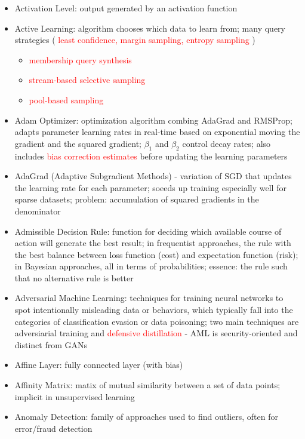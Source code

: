 \documentclass[a4paper]{article}
\newcommand{\cmark}{\ding{51}}%
\newcommand{\done}{\rlap{$\square$}{\raisebox{2pt}{\large\hspace{1pt}\cmark}}\hspace{-2.5pt}}
\newcommand{\followup}[1]{\textcolor{red}{ #1 }}
\begin{document}
\begin{itemize}
    \item [\done] Activation Level: output generated by an activation function
    \item [\done]  Active Learning: algorithm chooses which data to learn from; many query strategies (\followup{least confidence, margin sampling, entropy sampling})
    \begin{itemize}
        \item \followup{membership query synthesis}
        \item \followup{stream-based selective sampling}
        \item \followup{pool-based sampling}
    \end{itemize}
    \item [\done] Adam Optimizer: optimization algorithm combing AdaGrad and RMSProp; adapts parameter learning rates in real-time based on exponential moving the gradient and the squared gradient; $\beta_1$ and $\beta_2$ control decay rates; also includes \followup{bias correction estimates} before updating the learning parameters
    \item [\done] AdaGrad (Adaptive Subgradient Methods) - variation of SGD that updates the learning rate for each parameter; soeeds up training especially well for sparse datasets; problem: accumulation of squared gradients in the denominator
    \item [\done] Admissible Decision Rule: function for deciding which available course of action will generate the best result; in frequentist approaches, the rule with the best balance between loss function (cost) and expectation function (risk); in Bayesian approaches, all in terms of probabilities; essence: the rule such that no alternative rule is better
    \item [\done] Adversarial Machine Learning: techniques for training neural networks to spot intentionally misleading data or behaviors, which typically fall into the categories of classification evasion or data poisoning; two main techniques are adversiarial training and \followup{defensive distillation} - AML is security-oriented and distinct from GANs
    \item [\done] Affine Layer: fully connected layer (with bias)
    \item [\done] Affinity Matrix: matix of mutual similarity between a set of data points; implicit in unsupervised learning
    \item [\done] Anomaly Detection: family of approaches used to find outliers, often for error/fraud detection

\end{itemize}
\end{document}
